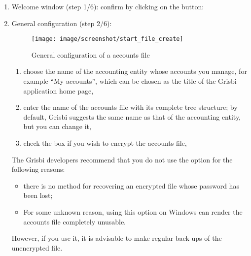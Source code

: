 \begin{enumerate}
	\item Welcome window (step 1/6): confirm by clicking on the  button:%
	\item General configuration (step 2/6):

\begin{figure}[htbp]
	\begin{center}
		\texttt{[image: image/screenshot/start\_file\_create]}
	\end{center}
	\caption{General configuration of a accounts file}
	\label{start_file_create}
\end{figure}



		\begin{enumerate}
			\item choose the name of the accounting entity whose accounts you manage, for example \enquote{My accounts}, which can be chosen as the title of the Grisbi application home page,%
			\item enter the name of the accounts file with its complete tree structure; by default, Grisbi suggests the same name as that of the accounting entity, but you can change it,%
			\item check the  box if you wish \gls{to encrypt} the accounts file,%
		\end{enumerate}

The Grisbi developers recommend that you do not use the  option for the following reasons:
\begin{itemize}
	\item there is no method for recovering an encrypted file whose password has been lost;
	\item For some unknown reason, using this option on \gls{Windows} can render the accounts file completely unusable.
\end{itemize}  
However, if you use it, it is advisable to make regular back-ups of the unencrypted file.


\end{enumerate}

